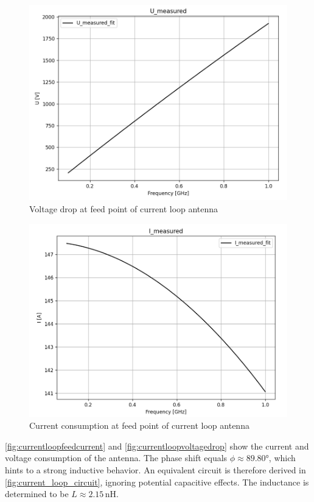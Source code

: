 \begin{figure}[h]
	\centering
	\includegraphics[width=0.5\linewidth]{content/30_simulations/img/current_loop_voltage_drop}
	\caption{Voltage drop at feed point of current loop antenna}
	\label{fig:currentloopvoltagedrop}
\end{figure}

\begin{figure}[h]
	\centering
	\includegraphics[width=0.5\linewidth]{content/30_simulations/img/current_loop_feed_current}
	\caption{Current consumption at feed point of current loop antenna}
	\label{fig:currentloopfeedcurrent}
\end{figure}

\autoref{fig:currentloopfeedcurrent} and \autoref{fig:currentloopvoltagedrop} show the current and voltage consumption of the antenna. The phase shift equals $\phi\approx89.80°$, which hints to a strong inductive behavior. An equivalent circuit is therefore derived in \autoref{fig:current_loop_circuit}, ignoring potential capacitive effects. The inductance is determined to be $L\approx2.15\,\mathrm{nH}$. 

